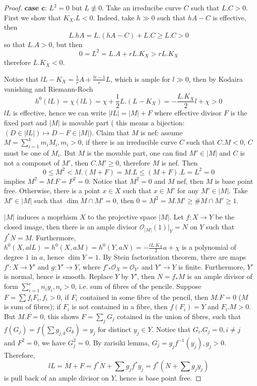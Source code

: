 \documentclass{article}
\begin{document}
\begin{proof}
	\textbf{case c}: $ L^2=0$ but $ L\not\equiv 0 $. Take an irreducibe curve $ C $ such that $ L.C>0 $. First we show that $ K_X.L<0 $. Indeed, take $ h\gg0 $ such that $ hA-C $ is effective, then 
	$$ L.hA=L.(hA-C)+L.C\geqslant L.C>0 $$
	so that $ L.A>0 $, but then
	$$ 0=L^2=L.A+rL.K_X>rL.K_X $$
	therefore $ L.K_X<0 $.
	
	Notice that $ lL-K_X=\frac{1}{r}A+\frac{lr-1}{r}L $, which is ample for $ l\gg 0 $, then by Kodaira vanishing and Riemann-Roch
	$$ h^0(lL)=\chi(lL)=\chi+\frac{1}{2}L.(L-K_X)=-\frac{L.K_X}{2}l+\chi>0 $$
	$ lL $ is effective, hence we can write $ |lL|=|M|+F $ where effective divisor  $ F $ is the fixed part and $ |M| $ is movable part ( this means a bijection: $ (D\in |lL|)\mapsto D-F\in |M| $). Claim that $ M $ is nef: assume $ M=\sum_{i=1}^{k}m_iM_i, m_i>0 $, if there is an irreducible curve $ C $ such that $ C.M<0 $, $ C $ must be one of $ M_i $. But $ M $ is the movable part, one can find $ M'\in |M| $ and $ C $ is not a componet of $ M' $, then $ C.M'\geqslant 0 $, therefore $ M $ is nef. Then
	$$ 0\leqslant M^2<M.(M+F)=M.L\leqslant(M+F).L=L^2=0  $$
	implies $ M^2=M.F=F^2=0 $. Notice that $ M^2=0 $ and $ M $ nef, then $ M $ is base point free. Otherwise, there is a point $ x\in X $ such that $ x\in M'  $ for any $ M'\in |M| $. Take $ M'\in |M| $ such that $ \dim M\cap M'=0 $, then $ 0=M^2=M.M'\geqslant\#M\cap M'\geqslant1 $.
	
	$ |M| $ induces a moprhism $ X$ to the projective space $ |M| $. Let $f:X\to Y $ be the closed image,  then there is an ample divisor $ \mathcal{O}_{|M|}(1)|_Y=N $ on $ Y $ such that $ f^*N=M $. Furthermore, $ h^0(X,alL)=h^0(X,aM)=h^0(Y,aN)=-\frac{lL.K_X}{2}a+\chi $ is a polynomial of degree $ 1 $ in $ a $, hence $ \dim Y=1 $.	By Stein factorization theorem, there are  maps $ f':X\to Y' $ and $ g:Y'\to Y $, where $ f'_*\mathcal{O}_X=\mathcal{O}_{Y'} $ and $ Y'\to Y $ is finite. Furthermore, $ Y' $ is normal, hence is smooth.	Replace $ Y $ by $ Y' $, then $ N=f_*M $ is an ample divisor of form $ \sum_{i=1}^{r}n_iy_i, n_i>0 $, i.e. sum of fibres of the pencile. Suppose $ F=\sum f_iF_i, f_i>0 $, if $ F_i $ contained in some fibre of the pencil, then $ M.F=0 $ ($ M $ is sum of fibres); if $ F_i $ is not contained in a fibre, then $ f(F_i)=Y $ and $ F_i.M>0 $. But $ M.F=0 $, this shows $ F=\sum_{j}G_j $ cotained in the union of fibres, such that $ f(G_j)=f(\sum g_{j,k}G_k)=y_j $ for distinct $ y_j\in Y $. Notice that $ G_i.G_j=0, i\neq j $ and $ F^2=0 $, we have $ G_j^2=0 $. By zarisiki lemma, $ G_j=g_jf^{-1}(y_j), g_j>0 $. Therefore, 
	$$ lL=M+F=f^*N+\sum g_jf^*y_j=f^*(N+\sum g_jy_j) $$
	is pull back of an ample divisor on $ Y $, hence is base point free. 
\end{proof}
\end{document}
